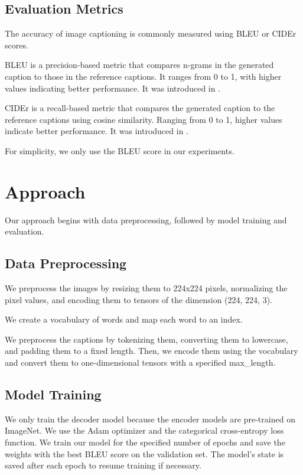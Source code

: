 \documentclass[12pt]{article}
\theoremstyle{plain}
\theoremstyle{definition}
\theoremstyle{remark}
\begin{document}
\subsection{Evaluation Metrics}
The accuracy of image captioning is commonly measured using BLEU or CIDEr scores.
\par BLEU is a precision-based metric that compares n-grams in the generated caption to those in the reference captions. It ranges from 0 to 1, with higher values indicating better performance. It was introduced in \cite{papineni}.
\par CIDEr is a recall-based metric that compares the generated caption to the reference captions using cosine similarity. Ranging from 0 to 1, higher values indicate better performance. It was introduced in \cite{vedantam}.
\par For simplicity, we only use the BLEU score in our experiments.



\section{Approach}
\label{sec:approach}

Our approach begins with data preprocessing, followed by model training and evaluation.

\subsection{Data Preprocessing}
\par We preprocess the images by resizing them to 224x224 pixels, normalizing the pixel values, and encoding them to tensors of the dimension (224, 224, 3).
\par We create a vocabulary of words and map each word to an index.
\par We preprocess the captions by tokenizing them, converting them to lowercase, and padding them to a fixed length. Then, we encode them using the vocabulary and convert them to one-dimensional tensors with a specified max\_length.

\subsection{Model Training}
We only train the decoder model because the encoder models are pre-trained on ImageNet. We use the Adam optimizer and the categorical cross-entropy loss function. We train our model for the specified number of epochs and save the weights with the best BLEU score on the validation set. The model's state is saved after each epoch to resume training if necessary.
\end{document}
